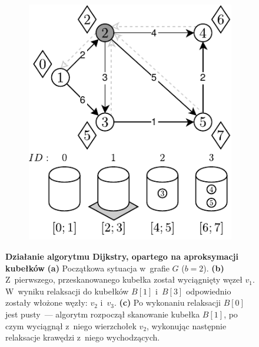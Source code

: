 \begin{figure}[!htbp]
\begin{subfigure}[b]{0.3\textwidth}
		\caption{}
	\end{subfigure}
	\begin{subfigure}[b]{0.3\textwidth}
		\includegraphics[width=\textwidth]{Chapter_II/APROXIMATE-BUCKETS-Example/c.pdf}
		\caption{}
	\end{subfigure}
	\caption{\textbf{Działanie algorytmu Dijkstry, opartego na aproksymacji kubełków} \textbf{(a)} Początkowa sytuacja w~grafie $G$ ($b=2$). \textbf{(b)} Z~pierwszego, przeskanowanego kubełka został wyciągnięty węzeł $v_{1}$. W~wyniku relaksacji do kubełków $B \left[ 1 \right]$ i~$B \left[ 3 \right]$ odpowiednio zostały włożone węzły: $v_{2}$ i~$v_{3}$.  \textbf{(c)} Po wykonaniu relaksacji $B \left[ 0 \right]$ jest pusty~--- algorytm rozpoczął skanowanie kubełka $B \left[ 1 \right]$, po czym wyciągnął z~niego wierzchołek $v_{2}$, wykonując następnie relaksacje krawędzi z~niego wychodzących. } \label{fig:exampleAproximateBuckets1}
\end{figure}

